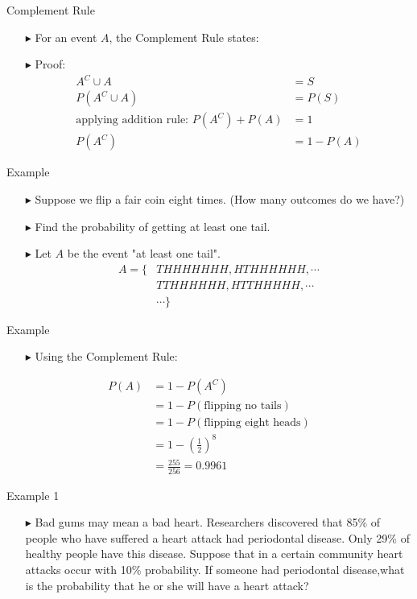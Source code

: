 \documentclass[12pt]{beamer}
\begin{document}
\begin{frame}{Complement Rule}
	\begin{itemize}
		\item[\color{blue}$\blacktriangleright$] For an event $A$, the Complement Rule states:
		\item[\color{blue}$\blacktriangleright$] Proof:
		\begin{align*}
			A^C\cup A&=S\\
			P(A^C\cup A)&=P(S)\\
			\text{applying addition rule: }P(A^C)+P(A)&=1\\
			P(A^C)&=1-P(A)
		\end{align*}
	\end{itemize}
\end{frame}
\begin{frame}{Example}
	\begin{itemize}
		\item[\color{blue}$\blacktriangleright$] Suppose we flip a fair coin eight times. (How many outcomes do we have?)
		\item[\color{blue}$\blacktriangleright$] Find the probability of getting at least one tail.
		\item[\color{blue}$\blacktriangleright$] Let $A$ be the event "at least one tail".
				\begin{align*}
			A=\{&THHHHHHH,HTHHHHHH,\cdots\\
			&TTHHHHHH,HTTHHHHH,\cdots\\
			&\cdots\}
		\end{align*}
	\end{itemize}
\end{frame}
\begin{frame}{Example}
	\begin{itemize}
		\item[\color{blue}$\blacktriangleright$] Using the Complement Rule:
			\end{itemize}
		\begin{align*}
			P(A)&=1-P(A^C)\\
			&=1-P(\text{flipping no tails})\\
			&=1-P(\text{flipping eight heads})\\
			&=1-(\frac{1}{2})^8\\
			&=\frac{255}{256}=0.9961
		\end{align*}

\end{frame}
\begin{frame}{Example 1}
	\begin{itemize}
		\item[\color{blue}$\blacktriangleright$] Bad gums may mean a bad heart. Researchers discovered that 85\% of people who have suffered a heart attack had periodontal disease. Only 29\% of healthy people have this disease. Suppose that in a certain community heart attacks occur with 10\% probability. If someone had periodontal disease,what is the probability that he or she will have a heart attack?
	\end{itemize}
	
\end{frame}
\end{document}
